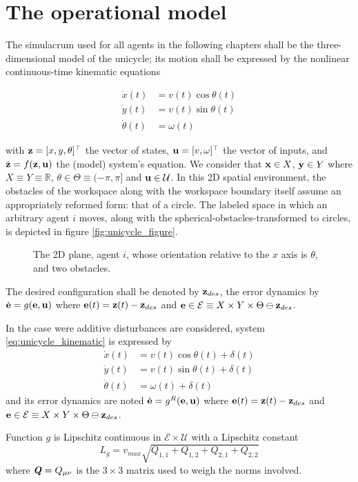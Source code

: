 \section{The operational model}

The simulacrum used for all agents in the following chapters shall be the
three-dimensional model of the unicycle; its motion shall be expressed by the
nonlinear continuous-time kinematic equations

\begin{align}
  \dot{x}(t)       &= v(t) \cos\theta(t) \\
  \dot{y}(t)       &= v(t) \sin\theta(t) \\
  \dot{\theta}(t)  &= \omega(t)
\label{eq:unicycle_kinematic}
\end{align}

with $\bm{\mathbf{z}} = [x,y,\theta]^{\top}$ the vector of states,
$\bm{\mathbf{u}} = [v, \omega]^{\top}$ the vector of inputs, and $\dot{\bm{\mathbf{z}}} =
f(\bm{\mathbf{z}}, \bm{\mathbf{u}})$ the (model) system's equation. We consider that
$\bm{\mathbf{x}} \in X$, $\bm{\mathbf{y}} \in Y$ where $X \equiv Y \equiv \mathbb{R}$,
$\theta \in \Theta \equiv (-\pi, \pi]$ and $\bm{\mathbf{u}} \in \mathcal{U}$.
In this 2D spatial environment, the obstacles of the workspace along with the
workspace boundary itself assume an appropriately reformed form: that of a
circle. The labeled space in which an arbitrary agent $i$ moves, along with the
spherical-obstacles-transformed to circles, is depicted in figure
\eqref{fig:unicycle_figure}.

\begin{figure}[H]\centering
  
  \caption{The 2D plane, agent $i$, whose orientation relative to the $x$
    axis is $\theta$, and two obstacles.}
  \label{fig:unicycle_figure}
\end{figure}
The desired configuration shall be denoted by $\bm{\mathbf{z}}_{des}$,
the error dynamics by $\dot{\bm{\mathbf{e}}} = g(\bm{\mathbf{e}}, \bm{\mathbf{u}})$
where $\bm{\mathbf{e}}(t) = \bm{\mathbf{z}}(t) - \bm{\mathbf{z}}_{des}$ and
$\bm{\mathbf{e}} \in \mathcal{E} \equiv X \times Y \times \Theta \ominus \bm{\mathbf{z}}_{des}$.

In the case were additive disturbances are considered, system
\eqref{eq:unicycle_kinematic} is expressed by
\begin{align}
  \dot{x}(t)       &= v(t) \cos\theta(t) + \delta(t) \\
  \dot{y}(t)       &= v(t) \sin\theta(t) + \delta(t) \\
  \dot{\theta}(t)  &= \omega(t) + \delta(t)
\label{eq:unicycle_kinematic_with_disturbances}
\end{align}
and its error dynamics are noted $\dot{\bm{\mathbf{e}}} = g^R(\bm{\mathbf{e}}, \bm{\mathbf{u}})$
where $\bm{\mathbf{e}}(t) = \bm{\mathbf{z}}(t) - \bm{\mathbf{z}}_{des}$ and
$\bm{\mathbf{e}} \in \mathcal{E} \equiv X \times Y \times \Theta \ominus \bm{\mathbf{z}}_{des}$.

\begin{lemma}
  \label{lemma:lipschitz_unicycle}
  Function $g$ is Lipschitz continuous in $\mathcal{E} \times \mathcal{U}$ with
  a Lipschitz constant $$L_g = v_{max} \sqrt{Q_{1,1}+Q_{1,2}+Q_{2,1}+Q_{2,2}}$$
  where $\bm{\mathit{Q}} = Q_{\mu\nu}$ is the $3 \times 3$ matrix used to weigh the
  norms involved.
\end{lemma}
